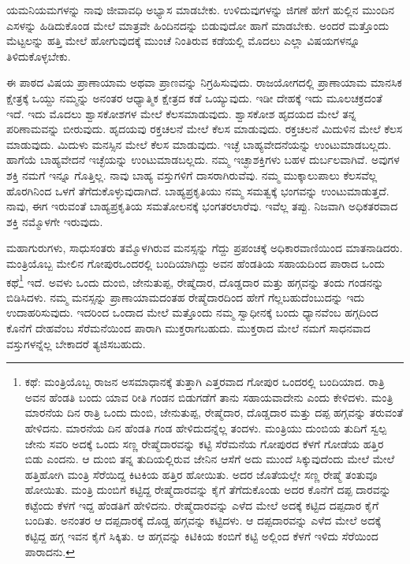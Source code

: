 ಯಮನಿಯಮಗಳನ್ನು ನಾವು ಜೀವಾವಧಿ ಅಭ್ಯಾಸ ಮಾಡಬೇಕು. ಉಳಿದುವುಗಳನ್ನು ಜಿಗಣೆ ಹೇಗೆ ಹುಲ್ಲಿನ ಮುಂದಿನ ಎಸಳನ್ನು ಹಿಡಿದುಕೊಂಡ ಮೇಲೆ ಮಾತ್ರವೇ ಹಿಂದಿನದನ್ನು ಬಿಡುವುದೋ ಹಾಗೆ ಮಾಡಬೇಕು. ಅಂದರೆ ಮತ್ತೊಂದು ಮೆಟ್ಟಲನ್ನು ಹತ್ತಿ ಮೇಲೆ ಹೋಗುವುದಕ್ಕೆ ಮುಂಚೆ ನಿಂತಿರುವ ಕಡೆಯಲ್ಲಿ ಮೊದಲು ಎಲ್ಲಾ ವಿಷಯಗಳನ್ನೂ ತಿಳಿದುಕೊಳ್ಳಬೇಕು.

ಈ ಪಾಠದ ವಿಷಯ ಪ್ರಾಣಾಯಾಮ ಅಥವಾ ಪ್ರಾಣವನ್ನು ನಿಗ್ರಹಿಸುವುದು. ರಾಜಯೋಗದಲ್ಲಿ ಪ್ರಾಣಾಯಾಮ ಮಾನಸಿಕ ಕ್ಷೇತ್ರಕ್ಕೆ ಒಯ್ದು ನಮ್ಮನ್ನು ಅನಂತರ ಆಧ್ಯಾತ್ಮಿಕ ಕ್ಷೇತ್ರದ ಕಡೆ ಒಯ್ಯುವುದು. ಇಡೀ ದೇಹಕ್ಕೆ ಇದು ಮೂಲಚಕ್ರದಂತೆ ಇದೆ. ಇದು ಮೊದಲು ಶ್ವಾಸಕೋಶಗಳ ಮೇಲೆ ಕೆಲಸಮಾಡುವುದು. ಶ್ವಾಸಕೋಶ ಹೃದಯದ ಮೇಲೆ ತನ್ನ ಪರಿಣಾಮವನ್ನು ಬೀರುವುದು. ಹೃದಯವು ರಕ್ತಚಲನೆ ಮೇಲೆ ಕೆಲಸ ಮಾಡುವುದು. ರಕ್ತಚಲನೆ ಮಿದುಳಿನ ಮೇಲೆ ಕೆಲಸ ಮಾಡುವುದು. ಮಿದುಳು ಮನಸ್ಸಿನ ಮೇಲೆ ಕೆಲಸ ಮಾಡುವುದು. ಇಚ್ಛೆ ಬಾಹ್ಯವೇದನೆಯನ್ನು ಉಂಟುಮಾಡಬಲ್ಲದು. ಹಾಗೆಯೆ ಬಾಹ್ಯವೇದನೆ ಇಚ್ಛೆಯನ್ನು ಉಂಟುಮಾಡಬಲ್ಲದು. ನಮ್ಮ ಇಚ್ಛಾಶಕ್ತಿಗಳು ಬಹಳ ದುರ್ಬಲವಾಗಿವೆ. ಅವುಗಳ ಶಕ್ತಿ ನಮಗೆ ಇನ್ನೂ ಗೊತ್ತಿಲ್ಲ. ನಾವು ಬಾಹ್ಯ ವಸ್ತುಗಳಿಗೆ ದಾಸರಾಗಿರುವೆವು. ನಮ್ಮ ಮುಕ್ಕಾಲುಪಾಲು ಕೆಲಸವೆಲ್ಲ ಹೊರಗಿನಿಂದ ಒಳಗೆ ತೆಗೆದುಕೊಳ್ಳುವುದಾಗಿದೆ. ಬಾಹ್ಯಪ್ರಕೃತಿಯು ನಮ್ಮ ಸಮತ್ವಕ್ಕೆ ಭಂಗವನ್ನು ಉಂಟುಮಾಡುತ್ತದೆ. ನಾವು, ಈಗ ಇರುವಂತೆ ಬಾಹ್ಯಪ್ರಕೃತಿಯ ಸಮತೋಲನಕ್ಕೆ ಭಂಗತರಲಾರೆವು. ಇವೆಲ್ಲ ತಪ್ಪು. ನಿಜವಾಗಿ ಅಧಿಕತರವಾದ ಶಕ್ತಿ ನಮ್ಮೊಳಗೇ ಇರುವುದು.

ಮಹಾಗುರುಗಳು, ಸಾಧುಸಂತರು ತಮ್ಮೊಳಗಿರುವ ಮನಸ್ಸನ್ನು ಗೆದ್ದು ಪ್ರಪಂಚಕ್ಕೆ ಅಧಿಕಾರವಾಣಿಯಿಂದ ಮಾತನಾಡಿದರು. ಮಂತ್ರಿಯೊಬ್ಬ ಮೇಲಿನ ಗೋಪುರ\break ಒಂದರಲ್ಲಿ ಬಂದಿಯಾಗಿದ್ದು ಅವನ ಹೆಂಡತಿಯ ಸಹಾಯದಿಂದ ಪಾರಾದ ಒಂದು ಕಥೆ\footnote{ಕಥೆ: ಮಂತ್ರಿಯೊಬ್ಬ ರಾಜನ ಅಸಮಾಧಾನಕ್ಕೆ ತುತ್ತಾಗಿ ಎತ್ತರವಾದ ಗೋಪುರ ಒಂದರಲ್ಲಿ ಬಂದಿಯಾದ. ರಾತ್ರಿ ಅವನ ಹೆಂಡತಿ ಬಂದು ಯಾವ ರೀತಿ ಗಂಡನ ಬಿಡುಗಡೆಗೆ ತಾನು ಸಹಾಯವಾದೇನು ಎಂದು ಕೇಳಿದಳು. ಮಂತ್ರಿ ಮಾರನೆಯ ದಿನ ರಾತ್ರಿ ಒಂದು ದುಂಬಿ, ಜೇನುತುಪ್ಪ, ರೇಷ್ಮೆದಾರ, ದೊಡ್ಡದಾರ ಮತ್ತು ದಪ್ಪ ಹಗ್ಗವನ್ನು ತರುವಂತೆ ಹೇಳಿದನು. ಮಾರನೆಯ ದಿನ ಹೆಂಡತಿ ಗಂಡ ಹೇಳಿದುದನ್ನೆಲ್ಲ ತಂದಳು. ಮಂತ್ರಿಯು ದುಂಬಿಯ ತುದಿಗೆ ಸ್ವಲ್ಪ ಜೇನು ಸವರಿ ಅದಕ್ಕೆ ಒಂದು ಸಣ್ಣ ರೇಷ್ಮೆದಾರವನ್ನು ಕಟ್ಟಿ ಸೆರೆಮನೆಯ ಗೋಪುರದ ಕೆಳಗೆ ಗೋಡೆಯ ಹತ್ತಿರ ಬಿಡು ಎಂದನು. ಆ ದುಂಬಿ ತನ್ನ ತುದಿಯಲ್ಲಿರುವ ಜೇನಿನ ಆಸೆಗೆ ಅದು ಮುಂದೆ ಸಿಕ್ಕುವುದೆಂದು ಮೇಲೆ ಮೇಲೆ ಹತ್ತಿಹೋಗಿ ಮಂತ್ರಿ ಸೆರೆಯಿದ್ದ ಕಿಟಕಿಯ ಹತ್ತಿರ ಹೋಯಿತು. ಅದರ ಜೊತೆಯಲ್ಲೇ ಸಣ್ಣ ರೇಷ್ಮೆ ತಂತುವೂ ಹೋಯಿತು. ಮಂತ್ರಿ ದುಂಬಿಗೆ ಕಟ್ಟಿದ್ದ ರೇಷ್ಮೆದಾರವನ್ನು ಕೈಗೆ ತೆಗೆದುಕೊಂಡು ಅದರ ಕೊನೆಗೆ ದಪ್ಪ ದಾರವನ್ನು ಕಟ್ಟೆಂದು ಕೆಳಗೆ ಇದ್ದ ಹೆಂಡತಿಗೆ ಹೇಳಿದನು. ರೇಷ್ಮೆದಾರವನ್ನು ಎಳೆದ ಮೇಲೆ ಅದಕ್ಕೆ ಕಟ್ಟಿದ ದಪ್ಪದಾರ ಕೈಗೆ ಬಂದಿತು. ಅನಂತರ ಆ ದಪ್ಪದಾರಕ್ಕೆ ದೊಡ್ಡ ಹಗ್ಗವನ್ನು ಕಟ್ಟಿದಳು. ಆ ದಪ್ಪದಾರವನ್ನು ಎಳೆದ ಮೇಲೆ ಅದಕ್ಕೆ ಕಟ್ಟಿದ್ದ ಹಗ್ಗ ಇವನ ಕೈಗೆ ಸಿಕ್ಕಿತು. ಆ ಹಗ್ಗವನ್ನು ಕಿಟಿಕಿಯ ಕಂಬಿಗೆ ಕಟ್ಟಿ ಅಲ್ಲಿಂದ ಕೆಳಗೆ ಇಳಿದು ಸೆರೆಯಿಂದ ಪಾರಾದನು.} ಇದೆ. ಅವಳು ಒಂದು ದುಂಬಿ, ಜೇನುತುಪ್ಪ, ರೇಷ್ಮೆದಾರ, ದೊಡ್ಡದಾರ ಮತ್ತು ಹಗ್ಗವನ್ನು ತಂದು ಗಂಡನನ್ನು ಬಿಡಿಸಿದಳು. ನಮ್ಮ ಮನಸ್ಸನ್ನು ಪ್ರಾಣಾಯಾಮದಂತಹ ರೇಷ್ಮೆದಾರದಿಂದ ಹೇಗೆ ಗೆಲ್ಲಬಹುದೆಂಬುದನ್ನು ಇದು ಉದಾಹರಿಸುವುದು. ಇದರಿಂದ ಒಂದಾದ ಮೇಲೆ ಮತ್ತೊಂದು ನಮ್ಮ ಸ್ವಾಧೀನಕ್ಕೆ ಬಂದು ಧ್ಯಾನವೆಂಬ ಹಗ್ಗದಿಂದ ಕೊನೆಗೆ ದೇಹವೆಂಬ ಸೆರೆಮನೆಯಿಂದ ಪಾರಾಗಿ ಮುಕ್ತರಾಗಬಹುದು. ಮುಕ್ತರಾದ ಮೇಲೆ ನಮಗೆ ಸಾಧನವಾದ ವಸ್ತುಗಳನ್ನೆಲ್ಲ ಬೇಕಾದರೆ ತ್ಯಜಿಸಬಹುದು.

